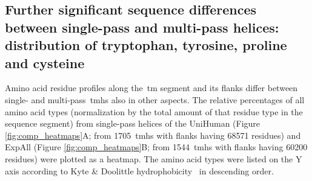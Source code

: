 \subsection{Further significant sequence differences between single-pass and multi-pass helices: distribution of tryptophan, tyrosine, proline and cysteine}

Amino acid residue profiles along the~\gls{tm} segment and its flanks differ between single- and multi-pass~\gls{tmh}s also in other aspects.
The relative percentages of all amino acid types (normalization by the total amount of that residue type in the sequence segment) from single-pass helices of the UniHuman (Figure \ref{fig:comp_heatmaps}A; from 1705~\gls{tmh}s with flanks having 68571 residues) and ExpAll (Figure \ref{fig:comp_heatmaps}B; from 1544~\gls{tmh}s with flanks having 60200 residues) were plotted as a heatmap.
The amino acid types were listed on the Y axis according to Kyte \& Doolittle hydrophobicity~\cite{Kyte1982} in descending order.

